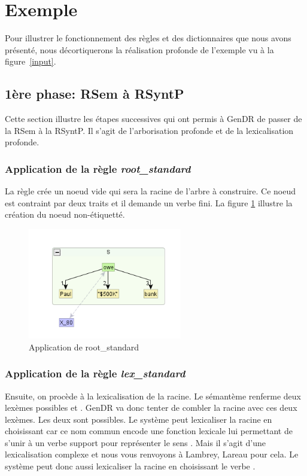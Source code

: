 
\section{Exemple}\label{secexemple}

Pour illustrer le fonctionnement des règles et des dictionnaires que nous avons présenté, nous décortiquerons la réalisation profonde de l'exemple vu à la figure~\ref{input}.

\subsection{1ère phase: RSem à RSyntP}
Cette section illustre les étapes successives qui ont permis à GenDR de passer de la \ac{RSem} à la \ac{RSyntP}. Il s'agit de l'arborisation profonde et de la lexicalisation profonde.

\subsubsection{Application de la règle \emph{root\_standard}}
La règle crée un noeud vide qui sera la racine de l'arbre à construire. Ce noeud est contraint par deux traits et il demande un verbe fini. La figure \ref{fig:rootstand} illustre la création du noeud non-étiquetté.
\begin{figure}[htb]
	\centering
	\includegraphics[width=0.6\textwidth, trim = {0cm 0cm 0cm 0cm},clip]{ch3/figs/inspecteur_root.png}
	\vspace{-0.5cm}
	\caption{Application de root\_standard}
	\label{fig:rootstand}
\end{figure}

\subsubsection{Application de la règle \emph{lex\_standard}}
Ensuite, on procède à la lexicalisation de la racine. Le sémantème  renferme deux lexèmes possibles  et . GenDR va donc tenter de combler la racine avec ces deux lexèmes. Les deux sont possibles. Le système peut lexicaliser la racine en choisissant  car ce nom commun encode une fonction lexicale lui permettant de s'unir à un verbe support pour représenter le sens . Mais il s'agit d'une lexicalisation complexe et nous vous renvoyons à Lambrey, Lareau pour cela. Le système peut donc aussi lexicaliser la racine en choisissant le verbe .

